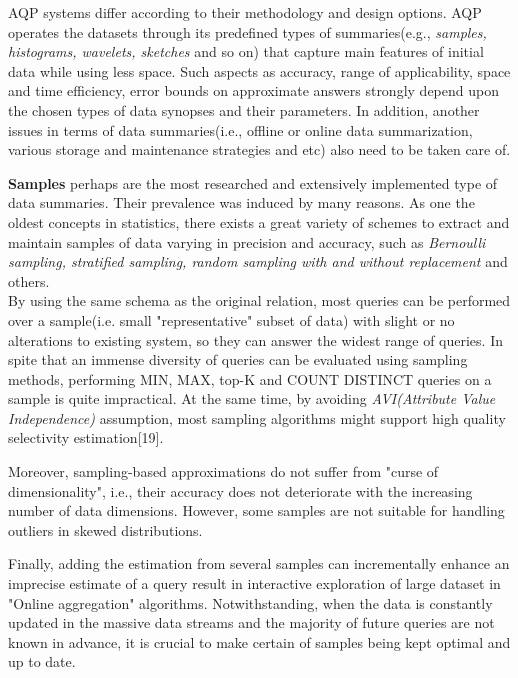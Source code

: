 \documentclass[10pt, conference, compsocconf]{IEEEtran}
\begin{document}
AQP systems differ according to their methodology and design options. AQP operates the datasets through its predefined types of summaries(e.g., \textit{samples, histograms, wavelets, sketches} and so on) that capture main features of initial data while using less space. Such aspects as accuracy, range of applicability, space and time efficiency, error bounds on approximate answers strongly depend upon the chosen types of data synopses and their parameters. In addition, another issues in terms of data summaries(i.e., offline or online data summarization, various storage and maintenance strategies and etc) also need to be taken care of.

\textbf{Samples} perhaps are the most researched and extensively implemented type of data summaries. Their prevalence was induced by many reasons. As one the oldest concepts in statistics, there exists a great variety of schemes to extract and maintain samples of data varying in precision and accuracy, such as \textit{Bernoulli sampling, stratified sampling, random sampling with and without replacement} and others. \\
By using the same schema as the original relation, most queries can be performed over a sample(i.e. small "representative" subset of data) with slight or no alterations to existing system, so they can answer the widest range of queries. In spite that an immense diversity of queries can be evaluated using sampling methods, performing MIN, MAX, top-K and COUNT DISTINCT queries on a sample is quite impractical. At the same time, by avoiding \textit{AVI(Attribute Value Independence)} assumption, most sampling algorithms might support high quality selectivity estimation[19].

Moreover, sampling-based approximations do not suffer from "curse of dimensionality", i.e., their accuracy does not deteriorate with the increasing number of data dimensions. However, some samples are not suitable for handling outliers in skewed distributions. 

Finally, adding the estimation from several samples can incrementally enhance an imprecise estimate of a query result in interactive exploration of large dataset in "Online aggregation" algorithms. Notwithstanding, when the data is constantly updated in the massive data streams and the majority of future queries are not known in advance, it is crucial to make certain of samples being kept optimal and up to date. 
\end{document}
